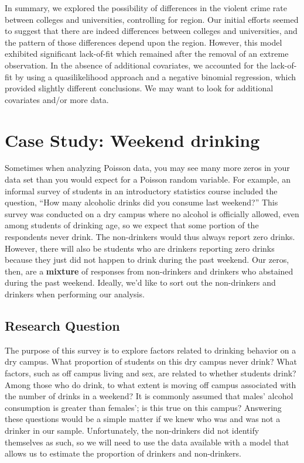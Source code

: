 \documentclass[
]{krantz}
\begin{document}
In summary, we explored the possibility of differences in the violent crime rate between colleges and universities, controlling for region. Our initial efforts seemed to suggest that there are indeed differences between colleges and universities, and the pattern of those differences depend upon the region. However, this model exhibited significant lack-of-fit which remained after the removal of an extreme observation. In the absence of additional covariates, we accounted for the lack-of-fit by using a quasilikelihood approach and a negative binomial regression, which provided slightly different conclusions. We may want to look for additional covariates and/or more data.

\hypertarget{cs:drinking}{%
\section{Case Study: Weekend drinking}\label{cs:drinking}}

Sometimes when analyzing Poisson data, you may see many more zeros in your data set than you would expect for a Poisson random variable. For example, an informal survey of students in an introductory statistics course included the question, ``How many alcoholic drinks did you consume last weekend?'' This survey was conducted on a dry campus where no alcohol is officially allowed, even among students of drinking age, so we expect that some portion of the respondents never drink. The non-drinkers would thus always report zero drinks. However, there will also be students who are drinkers reporting zero drinks because they just did not happen to drink during the past weekend. Our zeros, then, are a \textbf{mixture} of responses from non-drinkers and drinkers who abstained during the past weekend. Ideally, we'd like to sort out the non-drinkers and drinkers when performing our analysis.

\hypertarget{research-question}{%
\subsection{Research Question}\label{research-question}}

The purpose of this survey is to explore factors related to drinking behavior on a dry campus. What proportion of students on this dry campus never drink? What factors, such as off campus living and sex, are related to whether students drink? Among those who do drink, to what extent is moving off campus associated with the number of drinks in a weekend? It is commonly assumed that males' alcohol consumption is greater than females'; is this true on this campus? Answering these questions would be a simple matter if we knew who was and was not a drinker in our sample. Unfortunately, the non-drinkers did not identify themselves as such, so we will need to use the data available with a model that allows us to estimate the proportion of drinkers and non-drinkers.
\end{document}

